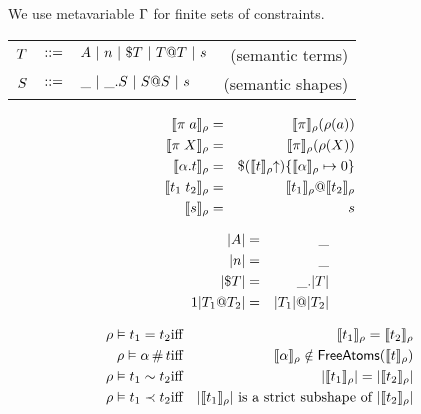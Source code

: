 \documentclass[english, mgr]{iithesis}
\begin{document}
We use metavariable $\Gamma$ for finite sets of constraints.


\begin{tabular}{rclr}
$T$ & $::=$ & $A
               \ |\  n
               \ |\  \$ T
               \ |\  T @ T
               \ |\  s$
    & (semantic terms) \\
$S$   & $::=$ & $\_
               \ |\  \_. S
               \ |\  S @ S
               \ |\  s$
    & (semantic shapes)
\end{tabular}

\begin{eqnarray*}
  \llbracket \pi \; a \rrbracket_{\rho} & = &
    \llbracket \pi \rrbracket_{\rho}(\rho(a)) \\
  \llbracket \pi \; X \rrbracket_{\rho} & = &
    \llbracket \pi \rrbracket_{\rho}(\rho(X)) \\
  \llbracket \alpha. t \rrbracket_{\rho} & = &
    \$ (\llbracket t \rrbracket_{\rho} \kern-3pt \uparrow)
      \{\llbracket \alpha \rrbracket_{\rho}\mapsto0\} \\
  \llbracket t_1 \; t_2 \rrbracket_{\rho} & = &
    \llbracket t_1 \rrbracket_{\rho} @ \llbracket t_2 \rrbracket_{\rho} \\
  \llbracket s \rrbracket_{\rho} & = & s
\end{eqnarray*}

\begin{eqnarray*}
  |A|                     & = & \_ \\
  |n|                            & = & \_ \\
  |\$ T|             & = & \_. |T| \\1
  |T_1 @ T_2| & = &
    |T_1| @ |T_2|
\end{eqnarray*}

\begin{eqnarray*}
  \rho \vDash t_1 = t_2 & \textrm{iff} &
    \llbracket t_1 \rrbracket_{\rho} = \llbracket t_2 \rrbracket_{\rho} \\
  \rho \vDash \alpha \,\#\, t & \textrm{iff} &
    \llbracket \alpha \rrbracket_{\rho} \notin
      \mathsf{FreeAtoms}(\llbracket t \rrbracket_{\rho}) \\
  \rho \vDash t_1 \sim t_2 & \textrm{iff} &
    |\llbracket t_1 \rrbracket_{\rho}| = |\llbracket t_2 \rrbracket_{\rho}| \\
  \rho \vDash t_1 \prec t_2 & \textrm{iff} &
    |\llbracket t_1 \rrbracket_{\rho}| \textrm{ is a strict subshape of }
      |\llbracket t_2 \rrbracket_{\rho}|
\end{eqnarray*}
\end{document}

